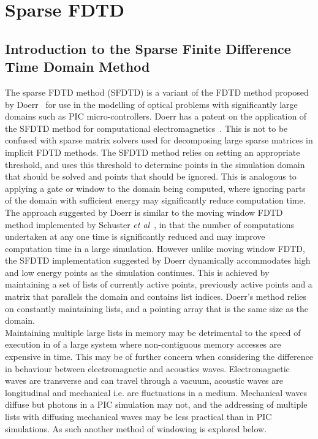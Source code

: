 \section{Sparse FDTD}
\subsection{Introduction to the Sparse Finite Difference Time Domain Method}
The sparse FDTD method (SFDTD) is a variant of the FDTD method proposed by Doerr~\cite{Doerr2013} for use in the modelling of optical problems with significantly large domains such as PIC micro-controllers. Doerr has a patent on the application of the SFDTD method for computational electromagnetics~\cite{Doerr2014p}. This is not to be confused with sparse matrix solvers used for decomposing large sparse matrices in implicit FDTD methods. The SFDTD method relies on setting an appropriate threshold, and uses this threshold to determine points in the simulation domain that should be solved and points that should be ignored. This is analogous to applying a gate or window to the domain being computed, where ignoring parts of the domain with sufficient energy may significantly reduce computation time.\\

The approach suggested by Doerr is similar to the moving window FDTD method implemented by Schuster \textit{et al}~\cite{Schuster2004}, in that the number of computations undertaken at any one time is significantly reduced and may improve computation time in a large simulation. However unlike moving window FDTD, the SFDTD implementation suggested by Doerr dynamically accommodates high and low energy points as the simulation continues. This is achieved by maintaining a set of lists of currently active points, previously active points and a matrix that parallels the domain and contains list indices. Doerr's method relies on constantly maintaining lists, and a pointing array that is the same size as the domain.\\

Maintaining multiple large lists in memory may be detrimental to the speed of execution in of a large system where non-contiguous memory accesses are expensive in time. This may be of further concern when considering the difference in behaviour between electromagnetic and acoustics waves. Electromagnetic waves are transverse and can travel through a vacuum, acoustic waves are longitudinal and mechanical i.e. are fluctuations in a medium. Mechanical waves diffuse but photons in a PIC simulation may not, and the addressing of multiple lists with diffusing mechanical waves may be less practical than in PIC simulations. As such another method of windowing is explored below. \\


